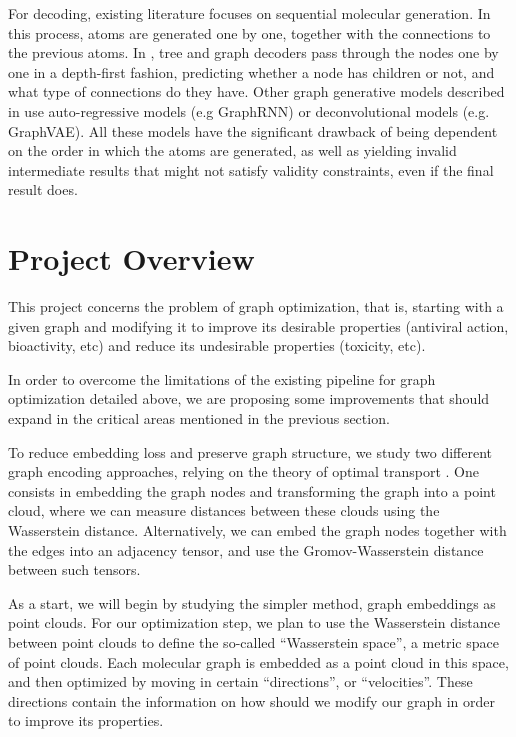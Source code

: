 \documentclass[11pt]{article}
\begin{document}
For decoding, existing literature focuses on sequential molecular generation. In this process, atoms are generated one by one, together with the connections to the previous atoms. In \cite{DBLP:journals/corr/abs-1802-04364,DBLP:journals/corr/abs-1812-01070,jin2020hierarchical}, tree and graph decoders pass through the nodes one by one in a depth-first fashion, predicting whether a node has children or not, and what type of connections do they have. Other graph generative models described in \cite{DBLP:journals/corr/abs-1901-00596} use auto-regressive models (e.g GraphRNN) or deconvolutional models (e.g. GraphVAE). All these models have the significant drawback of being dependent on the order in which the atoms are generated, as well as yielding invalid intermediate results that might not satisfy validity constraints, even if the final result does.

\section{Project Overview}
This project concerns the problem of graph optimization, that is, starting with a given graph and modifying it to improve its desirable properties (antiviral action, bioactivity, etc) and reduce its undesirable properties (toxicity, etc). 

In order to overcome the limitations of the existing pipeline for graph optimization detailed above, we are proposing some improvements that should expand in the critical areas mentioned in the previous section.

To reduce embedding loss and preserve graph structure, we study two different graph encoding approaches, relying on the theory of optimal transport \cite{vayer2018optimal}. One consists in embedding the graph nodes and transforming the graph into a point cloud, where we can measure distances between these clouds using the Wasserstein distance. Alternatively, we can embed the graph nodes together with the edges into an adjacency tensor, and use the Gromov-Wasserstein distance between such tensors.

As a start, we will begin by studying the simpler method, graph embeddings as point clouds. For our optimization step, we plan to use the Wasserstein distance between point clouds to define the so-called “Wasserstein space”, a metric space of point clouds. Each molecular graph is embedded as a point cloud in this space, and then optimized by moving in certain “directions”, or “velocities”. These directions contain the information on how should we modify our graph in order to improve its properties. 
\end{document}
